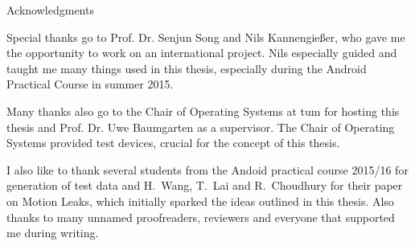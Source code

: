 \thispagestyle{empty}

\vspace*{2cm}

\begin{center}
{ Acknowledgments}
\end{center}

\vspace{1cm}

Special thanks go to Prof. Dr. Senjun Song and Nils Kannengießer, who gave me the opportunity to work on an international project. Nils especially guided and taught me many things used in this thesis, especially during the Android Practical Course in summer 2015.

Many thanks also go to the Chair of Operating Systems at \gls{tum} for hosting this thesis and Prof. Dr. Uwe Baumgarten as a supervisor. The Chair of Operating Systems provided test devices, crucial for the concept of this thesis.

I also like to thank several students from the Andoid practical course 2015/16 for generation of test data and H.\ Wang, T.\ Lai and R.\ Choudhury for their paper on Motion Leaks\cite{wang2015mole}, which initially sparked the ideas outlined in this thesis. Also thanks to many unnamed proofreaders, reviewers and everyone that supported me during writing.

\cleardoublepage{}
